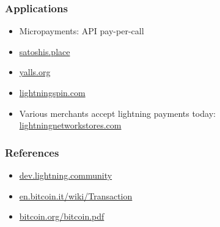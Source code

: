\documentclass{beamer}
\begin{document}
\begin{frame}
\frametitle{Applications}
\begin{itemize}
\item Micropayments: API pay-per-call
\item \url{satoshis.place}
\item \url{yalls.org}
\item \url{lightningspin.com}
\item Various merchants accept lightning payments today:
\url{lightningnetworkstores.com}
\end{itemize}
\end{frame}
\begin{frame}
\frametitle{References}

\begin{itemize}
\item \url{dev.lightning.community}
\item \url{en.bitcoin.it/wiki/Transaction}
\item \url{bitcoin.org/bitcoin.pdf}
\end{itemize} %


\end{frame}


\end{document}
